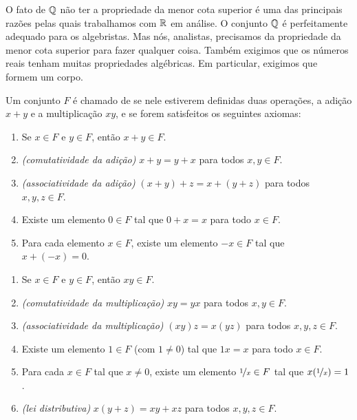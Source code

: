O fato de ${\mathbb{Q}}$ não ter a propriedade da menor cota superior é uma das
principais razões pelas quais trabalhamos com ${\mathbb{R}}$ em análise. O conjunto ${\mathbb{Q}}$
é perfeitamente adequado para os algebristas. Mas nós, analistas, precisamos
da propriedade da menor cota superior para fazer qualquer coisa.
Também exigimos que os números reais tenham muitas propriedades algébricas.
Em particular, exigimos que formem um corpo.


\begin{defn}
Um conjunto $F$ é chamado de \emph{} se nele estiverem
definidas duas operações, a adição $x+y$ e a multiplicação $xy$, e se forem
satisfeitos os seguintes axiomas:
\begin{enumerate}[({A}1)]
\item
Se $x \in F$ e $y \in F$, então $x+y \in F$.
\item
\emph{(comutatividade da adição)}
$x+y = y+x$ para todos $x,y \in F$.
\item
\emph{(associatividade da adição)}
$(x+y)+z = x+(y+z)$ para todos $x,y,z \in F$.
\item
Existe um elemento $0 \in F$ tal que
$0+x = x$ para todo $x \in F$.
\item
Para cada elemento $x\in F$, existe um elemento $-x \in F$
tal que $x + (-x) = 0$.
\end{enumerate}
\begin{enumerate}[({M}1)]
\item
Se $x \in F$ e $y \in F$, então $xy \in F$.
\item
\emph{(comutatividade da multiplicação)}
$xy = yx$ para todos $x,y \in F$.
\item
\emph{(associatividade da multiplicação)}
$(xy)z = x(yz)$ para todos $x,y,z \in F$.
\item
Existe um elemento $1 \in F$ (com $1 \neq 0$) tal que
$1x = x$ para todo $x \in F$.
\item
Para cada $x\in F$ tal que $x \neq 0$, existe um elemento
$\nicefrac{1}{x} \in F$
tal que $x(\nicefrac{1}{x}) = 1$.
\item[(D)]
\emph{(lei distributiva)} $x(y+z) = xy+xz$
para todos $x,y,z \in F$.
\end{enumerate}
\end{defn}

